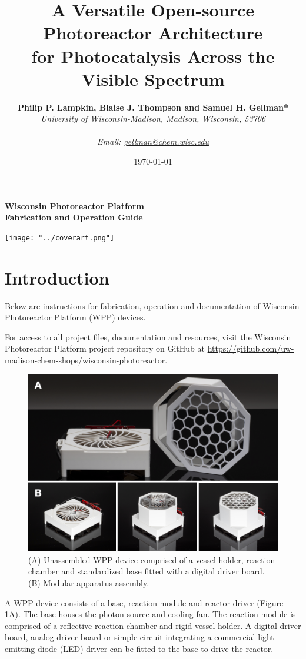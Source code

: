 \documentclass[11pt]{article}
\title{%
	\textbf{A Versatile Open-source Photoreactor Architecture\\ for Photocatalysis Across the Visible Spectrum}}
\author{\textbf{Philip P. Lampkin, Blaise J. Thompson and Samuel H. Gellman*} \\ \textit{University of Wisconsin-Madison, Madison, Wisconsin, 53706} \\ \\ \textit{Email: \href{mailto:gellman@chem.wisc.edu}{gellman@chem.wisc.edu}}}
\date{\today}
\let\stdsection\section
\renewcommand\section{\clearpage\stdsection}
\begin{document}
\maketitle
\textbf{{\centering \huge Wisconsin Photoreactor Platform \\ Fabrication and Operation Guide \\}}

\vspace{10mm} %
 
\texttt{[image: "../coverart.png"]}

\tableofcontents

\section{Introduction}

Below are instructions for fabrication, operation and documentation of Wisconsin Photoreactor Platform (WPP) devices.

For access to all project files, documentation and resources, visit the Wisconsin Photoreactor Platform project repository on GitHub at \href{https://github.com/uw-madison-chem-shops/wisconsin-photoreactor}{https://github.com/uw-madison-chem-shops/wisconsin-photoreactor}.

\begin{figure}[H]
	\includegraphics[width=\textwidth]{"./fig1.png"}
	\caption{(A) Unassembled WPP device comprised of a vessel holder, reaction chamber and standardized base fitted with a digital driver board. (B) Modular apparatus assembly.}
\end{figure}
A WPP device consists of a base, reaction module and reactor driver (Figure 1A).
The base houses the photon source and cooling fan.
The reaction module is comprised of a reflective reaction chamber and rigid vessel holder.
A digital driver board, analog driver board or simple circuit integrating a commercial light emitting diode (LED) driver can be fitted to the base to drive the reactor.
\end{document}
